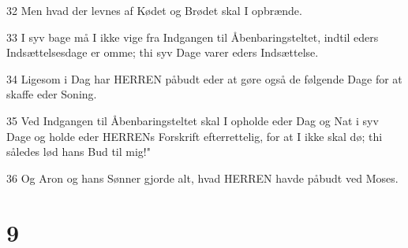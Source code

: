\par 32 Men hvad der levnes af Kødet og Brødet skal I opbrænde.
\par 33 I syv bage må I ikke vige fra Indgangen til Åbenbaringsteltet, indtil eders Indsættelsesdage er omme; thi syv Dage varer eders Indsættelse.
\par 34 Ligesom i Dag har HERREN påbudt eder at gøre også de følgende Dage for at skaffe eder Soning.
\par 35 Ved Indgangen til Åbenbaringsteltet skal I opholde eder Dag og Nat i syv Dage og holde eder HERRENs Forskrift efterrettelig, for at I ikke skal dø; thi således lød hans Bud til mig!"
\par 36 Og Aron og hans Sønner gjorde alt, hvad HERREN havde påbudt ved Moses.

\chapter{9}

